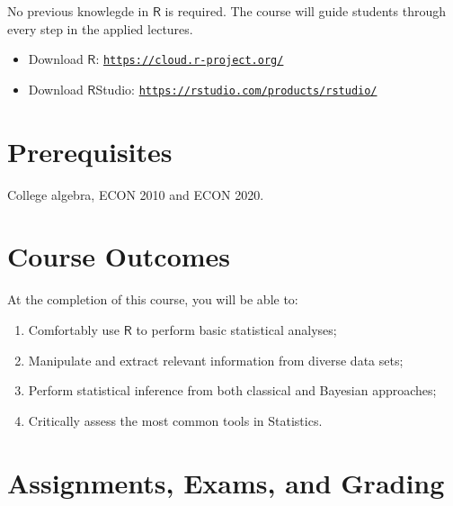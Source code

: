 \documentclass[11pt,]{article}
\providecommand{\tightlist}{%
  \setlength{\itemsep}{0pt}\setlength{\parskip}{0pt}}
\begin{document}
No previous knowlegde in \(\textsf{R}\) is required. The course will
guide students through every step in the applied lectures.

\begin{itemize}
\tightlist
\item
  Download \(\textsf{R}\):
  \href{https://cloud.r-project.org/}{\texttt{https://cloud.r-project.org/}}
\item
  Download \(\textsf{R}\)Studio:
  \href{https://rstudio.com/products/rstudio/}{\texttt{https://rstudio.com/products/rstudio/}}
\end{itemize}

\bigskip

\hypertarget{prerequisites}{%
\section{Prerequisites}\label{prerequisites}}

\vspace{.1cm}

College algebra, ECON 2010 and ECON 2020.

\hypertarget{course-outcomes}{%
\section{Course Outcomes}\label{course-outcomes}}

At the completion of this course, you will be able to:

\begin{enumerate}
\def\labelenumi{\arabic{enumi}.}
\item
  Comfortably use \(\textsf{R}\) to perform basic statistical analyses;
\item
  Manipulate and extract relevant information from diverse data sets;
\item
  Perform statistical inference from both classical and Bayesian
  approaches;
\item
  Critically assess the most common tools in Statistics.
\end{enumerate}

\hypertarget{assignments-exams-and-grading}{%
\section{Assignments, Exams, and
Grading}\label{assignments-exams-and-grading}}
\end{document}
